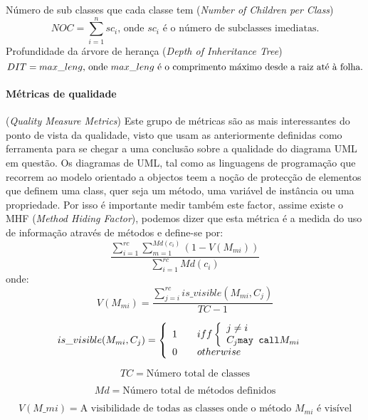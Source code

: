 Número de sub classes que cada classe tem (\textit{Number of Children per Class})
\begin{displaymath}
NOC = \sum_{i=1}^{n} sc_i  \textrm{, onde $sc_i$ é o número de subclasses imediatas.}
\end{displaymath}
Profundidade da árvore de herança (\textit{Depth of Inheritance Tree})
\begin{displaymath}
DIT = max\_leng  \textrm{, onde $ max\_leng $ é o comprimento máximo desde a raiz até à folha.}
\end{displaymath}

\paragraph{Métricas de qualidade} (\textit{Quality Measure Metrics}) Este grupo de métricas são as mais interessantes do ponto de vista da qualidade, visto que
usam as anteriormente definidas como ferramenta para se chegar a uma conclusão sobre a qualidade do diagrama UML em questão.
Os diagramas de UML, tal como as linguagens de programação que recorrem ao modelo orientado a objectos teem a noção de protecção de elementos que definem uma class,
quer seja um método, uma variável de instância ou uma propriedade. Por isso é importante medir também este factor, assime existe o MHF (\textit{Method Hiding Factor}),
podemos dizer que esta métrica é a medida do uso de informação através de métodos e define-se por:
\begin{displaymath}
\frac{\sum_{i=1}^{rc} \sum_{m=1}^{Md(c_i)} (1-V(M_{mi}))} {\sum_{i=1}^{rc} Md(c_i)}
\end{displaymath}
onde:
$$V(M_{mi}) = \frac{\sum_{j=i}^{rc} is\_visible(M_{mi},C_j)}{TC-1} $$

\[ is\_visible(M_{mi},C_j) = \left\{ \begin{array}{l l}
	1 & \quad iff \left \{
		\begin{array}{l l}
			j \neq i \\
			C_j \texttt{may call} M_{mi}\\
		\end{array}
	\right.\\
0 & \quad otherwise\\
\end{array} \right. \]

$$TC = \textrm{Número total de classes}$$

$$Md = \textrm{Número total de métodos definidos}$$

$$V(M\_{mi}) = \textrm{A visibilidade de todas as classes onde o método $M_{mi}$ é visível}$$

